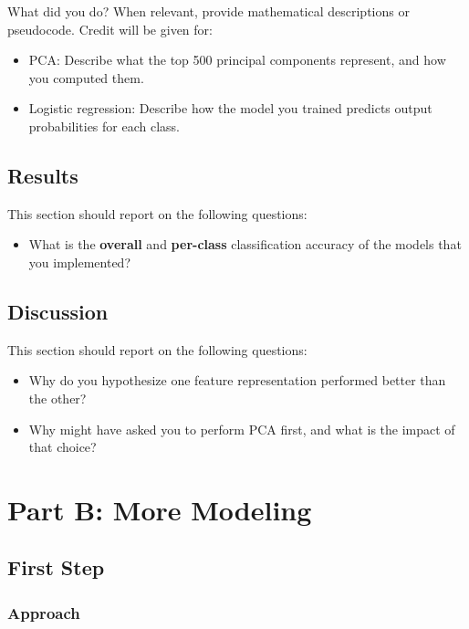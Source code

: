 \documentclass[11pt]{article}
\begin{document}
What did you do? When relevant, provide mathematical descriptions or pseudocode. Credit will be given for:

  \begin{itemize}
  \item PCA:  Describe what the top 500 principal components represent, and how you computed them.
  \item Logistic regression: Describe how the model you trained predicts output probabilities for each class.

  \end{itemize}

\subsection{Results}

This section should report on the following questions: 

\begin{itemize}
\item  What is the \textbf{overall} and \textbf{per-class} classification accuracy of the models that you implemented?
\end{itemize}

\subsection{Discussion}

This section should report on the following questions: 

\begin{itemize}
  \item Why do you hypothesize one feature representation performed better than the other?  
  \item Why might have asked you to perform PCA first, and what is the impact of that choice?
  \end{itemize}

\section{Part B: More Modeling}

\subsection{First Step}

\subsubsection{Approach}
\end{document}

